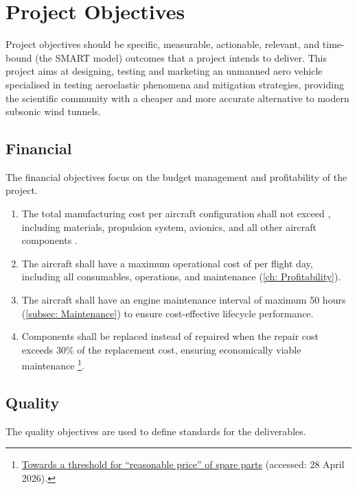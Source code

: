 \chapter{Project Objectives}

Project objectives should be specific, measurable, actionable, relevant, and time-bound (the SMART model) outcomes that a project intends to deliver. This project aims at designing, testing and marketing an unmanned aero vehicle specialised in testing aeroelastic phenomena and mitigation strategies, providing the scientific community with a cheaper and more accurate alternative to modern subsonic wind tunnels.

\section{Financial}
The financial objectives focus on the budget management and profitability of the project. 

\begin{enumerate}
    \item The total manufacturing cost per aircraft configuration shall not exceed , including materials, propulsion system, avionics, and all other aircraft components \cite{Castro2026}.

    \item The aircraft shall have a maximum operational cost of  per flight day, including all consumables, operations, and maintenance (\autoref{ch: Profitability}).

    \item The aircraft shall have an engine maintenance interval of maximum 50 hours (\autoref{subsec: Maintenance}) to ensure cost-effective lifecycle performance.

    \item Components shall be replaced instead of repaired when the repair cost exceeds 30\% of the replacement cost, ensuring economically viable maintenance \footnote{\href{https://repair.eu/wp-content/uploads/2025/01/Towards-a-threshold-for-_reasonable-price_-of-spare-parts.pdf}{Towards a threshold for “reasonable price” of spare parts} (accessed: 28 April 2026).}.
    
\end{enumerate}

\section{Quality}
The quality objectives are used to define standards for the deliverables.

